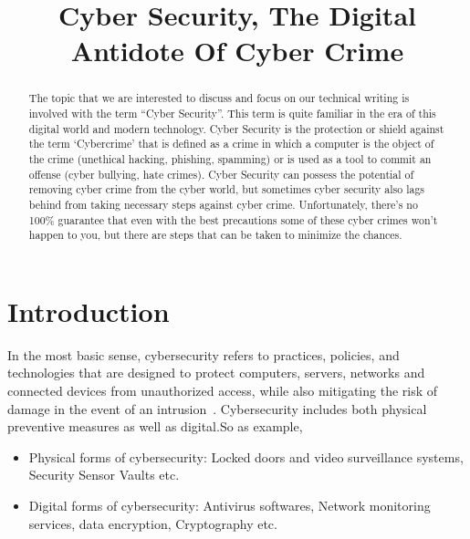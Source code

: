 \documentclass[conference,column]{IEEEtran}
\begin{document}
	\title{Cyber Security, The Digital Antidote Of Cyber Crime}
	\author{
		
	}
	
	\maketitle

	
	\begin{abstract}
		The topic that we are interested to discuss and focus on our technical writing is involved with the term “Cyber Security”. This term is quite familiar in the era of this digital world and modern technology. Cyber Security is the protection or shield against the term ‘Cybercrime’ that is defined as a crime in which a computer is the object of the crime (unethical hacking, phishing, spamming) or is used as a tool to commit an offense (cyber bullying, hate crimes). Cyber Security can possess the potential of removing cyber crime from the cyber world, but sometimes cyber security also lags behind from taking necessary steps against cyber crime. Unfortunately, there's no 100\% guarantee that even with the best precautions some of these cyber crimes won't happen to you, but there are steps that can be taken to minimize the chances.
	\end{abstract}

	\section{Introduction}
		In the most basic sense, cybersecurity refers to practices, policies, and technologies that are designed to protect computers, servers, networks and connected devices from unauthorized access, while also mitigating the risk of damage in the event of an intrusion~\cite{def}. Cybersecurity includes both physical preventive measures as well as digital.So as example,
		\begin{itemize}
			\item Physical forms of cybersecurity: Locked doors and video surveillance systems, Security Sensor Vaults etc.
			\item Digital forms of cybersecurity: Antivirus softwares, Network monitoring services, data encryption, Cryptography etc.
		\end{itemize}		
		
\end{document}
